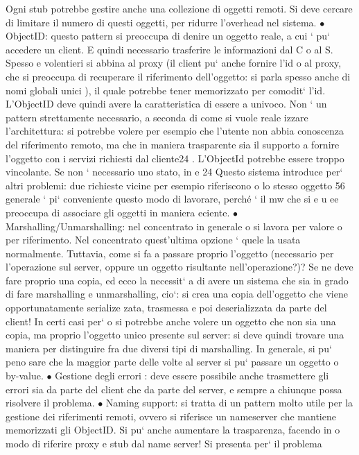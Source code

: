 \documentclass[a4paper,12pt]{article}
\begin{document}
Ogni stub potrebbe gestire anche
una collezione di oggetti remoti.
Si deve cercare di limitare il numero di questi oggetti, per ridurre l'overhead nel sistema.
$\bullet$ ObjectID: questo pattern si preoccupa di denire un oggetto reale, a cui
`
pu` accedere un client. E quindi necessario trasferire le informazioni dal C
o
al S. Spesso e volentieri si abbina al proxy (il client pu` anche fornire l'id
o
al proxy, che si preoccupa di recuperare il riferimento dell'oggetto: si parla
spesso anche di nomi globali unici ), il quale potrebbe tener memorizzato
per comodit` l'id. L'ObjectID deve quindi avere la caratteristica di essere
a
univoco.
Non ` un pattern strettamente necessario, a seconda di come si vuole reale
izzare l'architettura: si potrebbe volere per esempio che l'utente non abbia
conoscenza del riferimento remoto, ma che in maniera trasparente sia il
supporto a fornire l'oggetto con i servizi richiesti dal cliente24 . L'ObjectId potrebbe essere troppo vincolante. Se
non ` necessario uno stato, in
e
24 Questo sistema introduce per` altri problemi: due richieste vicine per esempio riferiscono
o
lo stesso oggetto
56
generale ` pi` conveniente questo modo di lavorare, perché ` il mw che si
e u
ee
preoccupa di associare gli oggetti in maniera eciente.
$\bullet$ Marshalling/Unmarshalling: nel concentrato in generale o si lavora per
valore o per riferimento. Nel concentrato quest'ultima opzione ` quele
la usata normalmente. Tuttavia, come si fa a passare proprio l'oggetto
(necessario per l'operazione sul server, oppure un oggetto risultante nell'operazione?)? Se ne deve fare proprio una
copia, ed ecco la necessit`
a
di avere un sistema che sia in grado di fare marshalling e unmarshalling,
cio`: si crea una copia dell'oggetto che viene opportunatamente serialize
zata, trasmessa e poi deserializzata da parte del client! In certi casi per`
o
si potrebbe anche volere un oggetto che non sia una copia, ma proprio
l'oggetto unico presente sul server: si deve quindi trovare una maniera per
distinguire fra due diversi tipi di marshalling. In generale, si pu` peno
sare che la maggior parte delle volte al server si pu` passare un oggetto
o
by-value.
$\bullet$ Gestione degli errori : deve essere possibile anche trasmettere gli errori
sia da parte del client che da parte del server, e sempre a chiunque possa
risolvere il problema.
$\bullet$ Naming support: si tratta di un pattern molto utile per la gestione dei
riferimenti remoti, ovvero si riferisce un nameserver che mantiene memorizzati gli ObjectID. Si pu` anche aumentare la
trasparenza, facendo in
o
modo di riferire proxy e stub dal name server! Si presenta per` il problema
\end{document}
